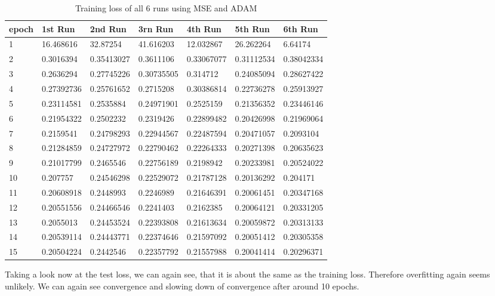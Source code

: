 \begin{table}[!ht]
    \centering
    \begin{tabular}{|l||l||l||l||l||l||l|}
    \hline
    epoch & 1st Run & 2nd Run & 3rn Run & 4th Run & 5th Run & 6th Run \\ \hline
        1 & 16.468616 & 32.87254 & 41.616203 & 12.032867 & 26.262264 & 6.64174 \\ \hline
        2 & 0.3016394 & 0.35413027 & 0.3611106 & 0.33067077 & 0.31112534 & 0.38042334 \\ \hline
        3 & 0.2636294 & 0.27745226 & 0.30735505 & 0.314712 & 0.24085094 & 0.28627422 \\ \hline
        4 & 0.27392736 & 0.25761652 & 0.2715208 & 0.30386814 & 0.22736278 & 0.25913927 \\ \hline
        5 & 0.23114581 & 0.2535884 & 0.24971901 & 0.2525159 & 0.21356352 & 0.23446146 \\ \hline
        6 & 0.21954322 & 0.2502232 & 0.2319426 & 0.22899482 & 0.20426998 & 0.21969064 \\ \hline
        7 & 0.2159541 & 0.24798293 & 0.22944567 & 0.22487594 & 0.20471057 & 0.2093104 \\ \hline
        8 & 0.21284859 & 0.24727972 & 0.22790462 & 0.22264333 & 0.20271398 & 0.20635623 \\ \hline
        9 & 0.21017799 & 0.2465546 & 0.22756189 & 0.2198942 & 0.20233981 & 0.20524022 \\ \hline
        10 & 0.207757 & 0.24546298 & 0.22529072 & 0.21787128 & 0.20136292 & 0.204171 \\ \hline
        11 & 0.20608918 & 0.2448993 & 0.2246989 & 0.21646391 & 0.20061451 & 0.20347168 \\ \hline
        12 & 0.20551556 & 0.24466546 & 0.2241403 & 0.2162385 & 0.20064121 & 0.20331205 \\ \hline
        13 & 0.2055013 & 0.24453524 & 0.22393808 & 0.21613634 & 0.20059872 & 0.20313133 \\ \hline
        14 & 0.20539114 & 0.24443771 & 0.22374646 & 0.21597092 & 0.20051412 & 0.20305358 \\ \hline
        15 & 0.20504224 & 0.2442546 & 0.22357792 & 0.21557988 & 0.20041414 & 0.20296371 \\ \hline
    \end{tabular}
    \caption{\label{tab:mse_adam_train}Training loss of all 6 runs using MSE and ADAM}
\end{table}

Taking a look now at the test loss, we can again see, that it is about the same as the training loss.
Therefore overfitting again seems unlikely. We can again see convergence and slowing down of convergence
after around 10 epochs. 

